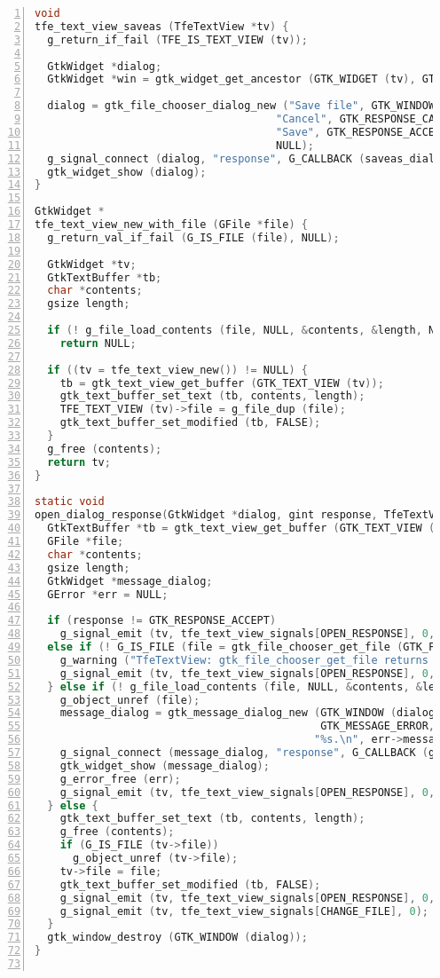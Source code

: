 \begin{lstlisting}[language=C, numbers=left]
void
tfe_text_view_saveas (TfeTextView *tv) {
  g_return_if_fail (TFE_IS_TEXT_VIEW (tv));

  GtkWidget *dialog;
  GtkWidget *win = gtk_widget_get_ancestor (GTK_WIDGET (tv), GTK_TYPE_WINDOW);

  dialog = gtk_file_chooser_dialog_new ("Save file", GTK_WINDOW (win), GTK_FILE_CHOOSER_ACTION_SAVE,
                                      "Cancel", GTK_RESPONSE_CANCEL,
                                      "Save", GTK_RESPONSE_ACCEPT,
                                      NULL);
  g_signal_connect (dialog, "response", G_CALLBACK (saveas_dialog_response), tv);
  gtk_widget_show (dialog);
}

GtkWidget *
tfe_text_view_new_with_file (GFile *file) {
  g_return_val_if_fail (G_IS_FILE (file), NULL);

  GtkWidget *tv;
  GtkTextBuffer *tb;
  char *contents;
  gsize length;

  if (! g_file_load_contents (file, NULL, &contents, &length, NULL, NULL)) /* read error */
    return NULL;

  if ((tv = tfe_text_view_new()) != NULL) {
    tb = gtk_text_view_get_buffer (GTK_TEXT_VIEW (tv));
    gtk_text_buffer_set_text (tb, contents, length);
    TFE_TEXT_VIEW (tv)->file = g_file_dup (file);
    gtk_text_buffer_set_modified (tb, FALSE);
  }
  g_free (contents);
  return tv;
}

static void
open_dialog_response(GtkWidget *dialog, gint response, TfeTextView *tv) {
  GtkTextBuffer *tb = gtk_text_view_get_buffer (GTK_TEXT_VIEW (tv));
  GFile *file;
  char *contents;
  gsize length;
  GtkWidget *message_dialog;
  GError *err = NULL;

  if (response != GTK_RESPONSE_ACCEPT)
    g_signal_emit (tv, tfe_text_view_signals[OPEN_RESPONSE], 0, TFE_OPEN_RESPONSE_CANCEL);
  else if (! G_IS_FILE (file = gtk_file_chooser_get_file (GTK_FILE_CHOOSER (dialog)))) {
    g_warning ("TfeTextView: gtk_file_chooser_get_file returns non GFile.\n");
    g_signal_emit (tv, tfe_text_view_signals[OPEN_RESPONSE], 0, TFE_OPEN_RESPONSE_ERROR);
  } else if (! g_file_load_contents (file, NULL, &contents, &length, NULL, &err)) { /* read error */
    g_object_unref (file);
    message_dialog = gtk_message_dialog_new (GTK_WINDOW (dialog), GTK_DIALOG_MODAL,
                                             GTK_MESSAGE_ERROR, GTK_BUTTONS_CLOSE,
                                            "%s.\n", err->message);
    g_signal_connect (message_dialog, "response", G_CALLBACK (gtk_window_destroy), NULL);
    gtk_widget_show (message_dialog);
    g_error_free (err);
    g_signal_emit (tv, tfe_text_view_signals[OPEN_RESPONSE], 0, TFE_OPEN_RESPONSE_ERROR);
  } else {
    gtk_text_buffer_set_text (tb, contents, length);
    g_free (contents);
    if (G_IS_FILE (tv->file))
      g_object_unref (tv->file);
    tv->file = file;
    gtk_text_buffer_set_modified (tb, FALSE);
    g_signal_emit (tv, tfe_text_view_signals[OPEN_RESPONSE], 0, TFE_OPEN_RESPONSE_SUCCESS);
    g_signal_emit (tv, tfe_text_view_signals[CHANGE_FILE], 0);
  }
  gtk_window_destroy (GTK_WINDOW (dialog));
}


\end{lstlisting}
